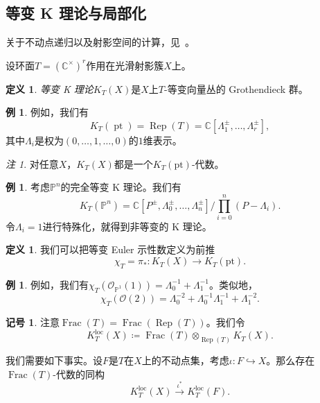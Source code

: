 \documentclass{amsart}
\theoremstyle{definition}
\newtheorem{defn}[thm]{定义}
\newtheorem{exm}[thm]{例}
\newtheorem{notn}[thm]{记号}
\theoremstyle{remark}
\newtheorem{rmk}[thm]{注}
\theoremstyle{plain}
\theoremstyle{definition}
\theoremstyle{remark}
\newcommand{\C}{\mathbb{C}}
\renewcommand{\P}{\mathbb{P}}
\newcommand{\mc}[1]{\mathcal{#1}}
\newcommand{\mr}[1]{\mathrm{#1}}
\newcommand{\on}[1]{\operatorname{#1}}
\newcommand{\1}{\mathbf{1}}
\newcommand{\2}{\mathbf{2}}
\newcommand{\3}{\mathbf{3}}
\newcommand{\loc}{\mr{loc}}
\begin{document}
\subsection{等变 K 理论与局部化}%
\label{sub:Equivariant K-theory and localization}

关于不动点递归以及射影空间的计算，见~\cite{GiventalK2}。

设环面\(T = (\C^{\times})^r\)作用在光滑射影簇\(X\)上。

\begin{defn}
    \textit{等变 K 理论}\(K_T(X)\)是\(X\)上\(T\)-等变向量丛的 Grothendieck 群。
\end{defn}

\begin{exm}
    例如，我们有
    \[ K_T(\on{pt}) = \on{Rep}(T) = \C[\Lambda_1^{\pm}, \ldots, \Lambda_r^{\pm}], \]
    其中\(\Lambda_i\)是权为\((0, \ldots, 1, \ldots, 0)\)的\(1\)维表示。
\end{exm}

\begin{rmk}
    对任意\(X\)，\(K_T(X)\)都是一个\(K_T(\mr{pt})\)-代数。
\end{rmk}

\begin{exm}
    考虑\(\P^n\)的完全等变 K 理论。我们有
    \[ K_T(\P^n) = \C[P^{\pm}, \Lambda_0^{\pm}, \ldots, \Lambda_n^{\pm}] \big/ \prod_{i=0}^n (P-\Lambda_i). \]
    令\(\Lambda_i = 1\)进行特殊化，就得到非等变的 K 理论。
\end{exm}

\begin{defn}
    我们可以把等变 Euler 示性数定义为前推
    \[ \chi_T = \pi_* \colon K_T(X) \to K_T(\mr{pt}). \]
\end{defn}

\begin{exm}
    例如，我们有\(\chi_T(\mc{O}_{\P^1}(1)) = \Lambda_0^{-1} + \Lambda_1^{-1}\)。类似地，
    \[ \chi_T(\mc{O}(2)) = \Lambda_0^{-2} + \Lambda_0^{-1} \Lambda_1^{-1} + \Lambda_1^{-2}. \]
\end{exm}

\begin{notn}
    注意\(\on{Frac}(T) = \on{Frac}(\on{Rep}(T))\)。我们令
    \[ K_T^{\loc}(X) \coloneqq \on{Frac}(T) \otimes_{\on{Rep}(T)} K_T(X). \]
\end{notn}

我们需要如下事实。设\(F\)是\(T\)在\(X\)上的不动点集，考虑\(\iota \colon F \hookrightarrow X\)。那么存在\(\on{Frac}(T)\)-代数的同构
\[ K_T^{\loc}(X) \xrightarrow{\iota^*} K_T^{\loc}(F). \]
\end{document}
